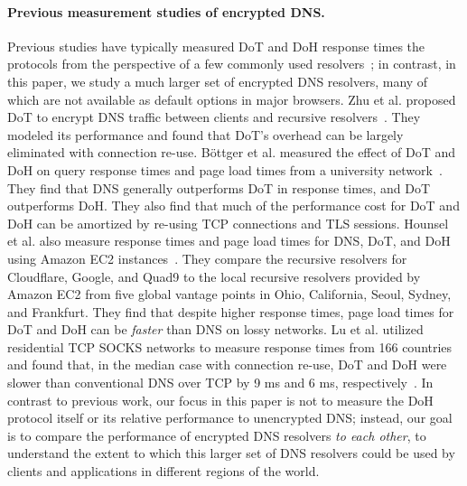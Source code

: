 \paragraph{Previous measurement studies of encrypted DNS.}
Previous studies have typically measured DoT and DoH response times the
protocols from the perspective of a few commonly used
resolvers~\cite{lu2019end-to-end}; in contrast, in this paper, we study a much
larger set of encrypted DNS resolvers, many of which are not available as
default options in major browsers.  Zhu et al. proposed DoT to encrypt DNS
traffic between clients and recursive resolvers~\cite{zhu2015connection}.
They modeled its performance and found that DoT's overhead can be largely
eliminated with connection re-use.  Böttger et al. measured the effect of DoT
and DoH on query response times and page load times from a university
network~\cite{boettger2019empirical}.  They find that DNS generally
outperforms DoT in response times, and DoT outperforms DoH.  They also find
that much of the performance cost for DoT and DoH can be amortized by re-using
TCP connections and TLS sessions.  Hounsel et al. also measure response times
and page load times for DNS, DoT, and DoH using Amazon EC2
instances~\cite{hounsel2020comparing}.  They compare the recursive resolvers
for Cloudflare, Google, and Quad9 to the local recursive resolvers provided by
Amazon EC2 from five global vantage points in Ohio, California, Seoul, Sydney,
and Frankfurt.  They find that despite higher response times, page load times
for DoT and DoH can be \emph{faster} than DNS on lossy networks.  Lu et al.
utilized residential TCP SOCKS networks to measure response times from 166
countries and found that, in the median case with connection re-use, DoT and
DoH were slower than conventional DNS over TCP by 9 ms and 6 ms,
respectively~\cite{lu2019end-to-end}.
In contrast to previous work, our focus in this paper is not to measure the
DoH protocol itself or its relative performance to unencrypted DNS; instead,
our goal is to compare the performance of encrypted DNS resolvers {\em to
each other}, to understand the extent to which this larger set of DNS
resolvers could be used by clients and applications in different regions of
the world.

